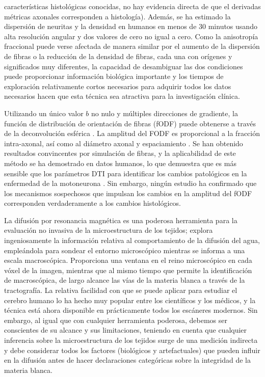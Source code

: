 características histológicas conocidas, no hay evidencia directa de que el derivadas métricas axonales corresponden a histología). Además, se ha estimado la dispersión de neuritas y la densidad \cite{127} en humanos en menos de 30 minutos usando alta resolución angular y dos valores de cero no igual a cero. Como la anisotropía fraccional puede verse afectada de manera similar por el aumento de la dispersión de fibras o la reducción de la densidad de fibras, cada una con orígenes y significados muy diferentes, la capacidad de desambiguar las dos condiciones puede proporcionar información biológica importante y los tiempos de exploración relativamente cortos necesarios para adquirir todos los datos necesarios hacen que esta técnica sea atractiva para la investigación clínica.

Utilizando un único valor $b$ no nulo y múltiples direcciones de gradiente, la función de distribución de orientación de fibras (fODF) puede obtenerse a través de la deconvolución esférica \cite{128}. La amplitud del FODF es proporcional a la fracción intra-axonal, así como al diámetro axonal y espaciamiento \cite{129,130}. Se han obtenido resultados convincentes por simulación de fibras, y la aplicabilidad de este método se ha demostrado en datos humanos, lo que demuestra que es más sensible que los parámetros DTI para identificar los cambios patológicos en la enfermedad de la motoneurona \cite{129}. Sin embargo, ningún estudio ha confirmado que los mecanismos sospechosos que impulsan los cambios en la amplitud del fODF corresponden verdaderamente a los cambios histológicos.

La difusión por resonancia magnética es una poderosa herramienta para la evaluación no invasiva de la microestructura de los tejidos; explora ingeniosamente la información relativa al comportamiento de la difusión del agua, empleándola para sondear el entorno microscópico mientras se informa a una escala macroscópica. Proporciona una ventana en el reino microscópico en cada vóxel de la imagen, mientras que al mismo tiempo que permite la identificación de macroscópica, de largo alcance las vías de la materia blanca a través de la tractografía. La relativa facilidad con que se puede aplicar para estudiar el cerebro humano lo ha hecho muy popular entre los científicos y los médicos, y la técnica está ahora disponible en prácticamente todos los escáneres modernos. Sin embargo, al igual que con cualquier herramienta poderosa, debemos ser conscientes de su alcance y sus limitaciones, teniendo en cuenta que cualquier inferencia sobre la microestructura de los tejidos surge de una medición indirecta y debe considerar todos los factores (biológicos y artefactuales) que pueden influir en la difusión antes de hacer declaraciones categóricas sobre la integridad de la materia blanca.